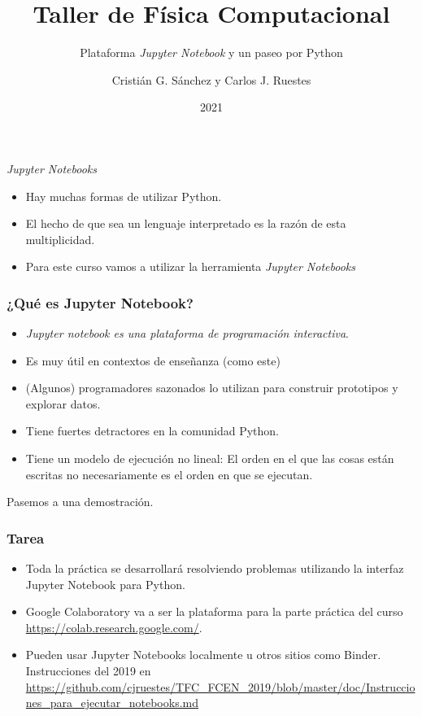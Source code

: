 \documentclass{beamer}
\title{Taller de Física Computacional}
\subtitle{Plataforma {\em Jupyter Notebook} y un paseo por Python}
\author{Cristián G. Sánchez y Carlos J. Ruestes}
\date{2021}
\begin{document}
\frame{\titlepage}

\begin{frame}
\begin{block}{\em Jupyter Notebooks}
\begin{itemize}
\item Hay muchas formas de utilizar Python.
\item El hecho de que sea un lenguaje interpretado es la razón de esta multiplicidad.
\item Para este curso vamos a utilizar la herramienta {\em Jupyter Notebooks}
\end{itemize}
\end{block}
\end{frame}

\begin{frame}
\frametitle{¿Qué es Jupyter Notebook?}
\begin{itemize}
\item {\em Jupyter notebook es una plataforma de {\em programación interactiva}}. 
\item Es muy útil en contextos de enseñanza (como este) 
\item (Algunos) programadores sazonados lo utilizan para construir prototipos y explorar datos.
\item Tiene fuertes detractores en la comunidad Python.
\item Tiene un modelo de ejecución \alert{no lineal}: El orden en el que las cosas están escritas no necesariamente es el orden en que se ejecutan.
\end{itemize}
\end{frame}

\begin{frame}[plain,c]

Pasemos a una demostración.

\end{frame}

\begin{frame}
\frametitle{Tarea}

\begin{itemize}
\item Toda la práctica se desarrollará resolviendo problemas utilizando la interfaz Jupyter Notebook para Python.
\item Google Colaboratory va a ser la plataforma para la parte práctica del curso \url{https://colab.research.google.com/}.
\item Pueden usar Jupyter Notebooks localmente u otros sitios como Binder. Instrucciones del 2019 en \url{https://github.com/cjruestes/TFC_FCEN_2019/blob/master/doc/Instrucciones_para_ejecutar_notebooks.md} 
\end{itemize}
\end{frame}
\end{document}
